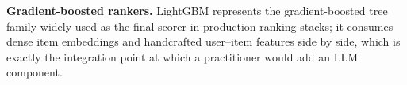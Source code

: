 \textbf{Gradient-boosted rankers.} LightGBM \cite{lightgbm} represents
the gradient-boosted tree family widely used as the final scorer in
production ranking stacks; it consumes dense item embeddings and
handcrafted user--item features side by side, which is exactly the
integration point at which a practitioner would add an LLM component.
